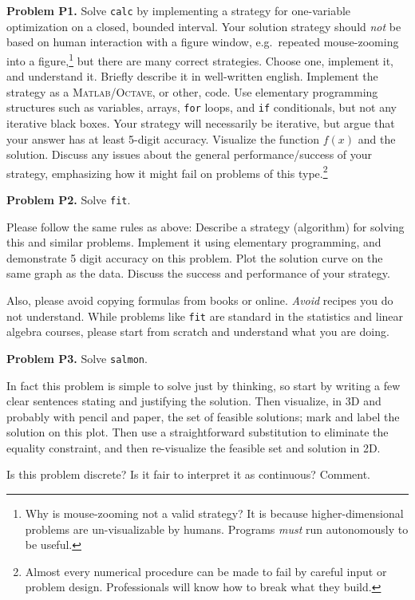 \documentclass[12pt]{amsart}
\newcommand{\Matlab}{\textsc{Matlab}\xspace}
\newcommand{\Octave}{\textsc{Octave}\xspace}
\newcommand{\prob}[1]{\bigskip\noindent\textbf{#1}\quad }
\begin{document}
\prob{Problem P1.}  Solve \texttt{calc} by implementing a strategy for one-variable optimization on a closed, bounded interval.  Your solution strategy should \emph{not} be based on human interaction with a figure window, e.g.~repeated mouse-zooming into a figure,\footnote{Why is mouse-zooming not a valid strategy?  It is because higher-dimensional problems are un-visualizable by humans.  Programs \emph{must} run autonomously to be useful.} but there are many correct strategies.  Choose one, implement it, and understand it.  Briefly describe it in well-written english.  Implement the strategy as a \Matlab/\Octave, or other, code.  Use elementary programming structures such as variables, arrays, \texttt{for} loops, and \texttt{if} conditionals, but not any iterative black boxes.  Your strategy will necessarily be iterative, but argue that your answer has at least 5-digit accuracy.  Visualize the function $f(x)$ and the solution.  Discuss any issues about the general performance/success of your strategy, emphasizing how it might fail on problems of this type.\footnote{Almost every numerical procedure can be made to fail by careful input or problem design.  Professionals will know how to break what they build.}




\prob{Problem P2.}  Solve \texttt{fit}.

Please follow the same rules as above:  Describe a strategy (algorithm) for solving this and similar problems.  Implement it using elementary programming, and demonstrate 5 digit accuracy on this problem.  Plot the solution curve on the same graph as the data.  Discuss the success and performance of your strategy.

Also, please avoid copying formulas from books or online.  \emph{Avoid} recipes you do not understand.  While problems like \texttt{fit} are standard in the statistics and linear algebra courses, please start from scratch and understand what you are doing.


\prob{Problem P3.}  Solve \texttt{salmon}.

In fact this problem is simple to solve just by thinking, so start by writing a few clear sentences stating and justifying the solution.  Then visualize, in 3D and probably with pencil and paper, the set of feasible solutions; mark and label the solution on this plot.  Then use a straightforward substitution to eliminate the equality constraint, and then re-visualize the feasible set and solution in 2D.

Is this problem discrete?  Is it fair to interpret it as continuous?  Comment.
\end{document}
